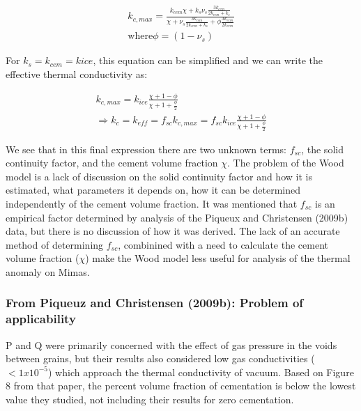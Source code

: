 \documentclass[11pt]{article} %
\begin{document}
	\begin{equation}
	\begin{split}
	k_{c,max} = \frac{k_{cem}\chi + k_{s}\nu_{s}\frac{3k_{cem}}{2k_{cem}+k_{s}}}{\chi +\nu_{s}\frac{3k_{cem}}{2k_{cem}+k_{s}}+\phi\frac{3k_{cem}}{2k_{cem}}} \\
	\text{where} \phi = (1-\nu_{s})
	\end{split}
	\end{equation}

	For $k_{s} = k_{cem} = k{ice}$, this equation can be simplified and we can write the effective thermal conductivity as:
	
	\begin{equation}
	\begin{split}
	k_{c,max} = k_{ice} \frac{\chi + 1 - \phi}{\chi + 1 + \frac{\phi}{2}} \\
	\Rightarrow k_{c} = k_{eff} = f_{sc} k_{c,max} = f_{sc} k_{ice} \frac{\chi + 1 - \phi}{\chi + 1 + \frac{\phi}{2}}
	\end{split}
	\end{equation}

	We see that in this final expression there are two unknown terms: $f_{sc}$, the solid continuity factor, and the cement volume fraction $\chi$. The problem of the Wood model is a lack of discussion on the solid continuity factor and how it is estimated, what parameters it depends on, how it can be determined independently of the cement volume fraction. It was mentioned that $f_{sc}$ is an empirical factor determined by analysis of the Piqueux and Christensen (2009b) data, but there is no discussion of how it was derived. The lack of an accurate method of determining $f_{sc}$, combinined with a need to calculate the cement volume fraction ($\chi$) make the Wood model less useful for analysis of the thermal anomaly on Mimas.
	
\subsubsection{From Piqueuz and Christensen (2009b): Problem of applicability}

	P and Q were primarily concerned with the effect of gas pressure in the voids between grains, but their results also considered low gas conductivities ($<1x10^{-5}$) which approach the thermal conductivity of vacuum. Based on Figure 8 from that paper, the percent volume fraction of cementation is below the lowest value they studied, not including their results for zero cementation. 
\end{document}
